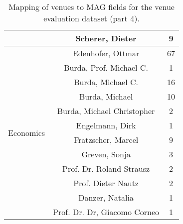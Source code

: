 \begin{table}
\begin{tabular}{|c|c|c|}
& Scherer, Dieter & 9 \\ \cline{2-3}
\hline
\multirow{12}{*}{Economics}
& Edenhofer, Ottmar & 67 \\ \cline{2-3}
& Burda, Prof. Michael C. & 1 \\ \cline{2-3}
& Burda, Michael C. & 16 \\ \cline{2-3}
& Burda, Michael & 10 \\ \cline{2-3}
& Burda, Michael Christopher & 2 \\ \cline{2-3}
& Engelmann, Dirk & 1 \\ \cline{2-3}
& Fratzscher, Marcel & 9 \\ \cline{2-3}
& Greven, Sonja & 3 \\ \cline{2-3}
& Prof. Dr. Roland Strausz & 2 \\ \cline{2-3}
& Prof. Dieter Nautz & 2 \\ \cline{2-3}
& Danzer, Natalia & 1 \\ \cline{2-3}
& Prof. Dr. Dr, Giacomo Corneo & 1 \\ \cline{2-3}
\hline
\end{tabular}
\caption{Mapping of venues to MAG fields for the venue evaluation dataset (part 4).}
\label{tab:venue_field_map_4}
\end{table}

